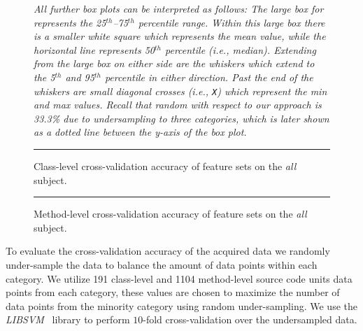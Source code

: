\begin{figure}[!tb]
  \centering
  \begin{adjustbox}{max size={.95\textwidth}{.95\textheight}}
    
  \end{adjustbox}
  \caption{Class-level cross-validation accuracy of feature sets on the \emph{all} subject.}
  \vspace{1mm}
  \footnotesize{\emph{All further box plots can be interpreted as follows: The large box for represents the 25$^{th}$--75$^{th}$ percentile range. Within this large box there is a smaller white square which represents the mean value, while the horizontal line represents 50$^{th}$ percentile (i.e., median). Extending from the large box on either side are the whiskers which extend to the 5$^{th}$ and 95$^{th}$ percentile in either direction. Past the end of the whiskers are small diagonal crosses (i.e., \texttt{X}) which represent the min and max values. Recall that random with respect to our approach is 33.3\% due to undersampling to three categories, which is later shown as a dotted line between the y-axis of the box plot.}}
  \vspace{2mm}
  \hrule
  \label{fig:all_cross_validation_features_class_graph}
\end{figure}

\begin{figure}[!tb]
  \centering
  \begin{adjustbox}{max size={.95\textwidth}{.95\textheight}}
    
  \end{adjustbox}
  \caption{Method-level cross-validation accuracy of feature sets on the \emph{all} subject.}
  \vspace{2mm}
  \hrule
  \label{fig:all_cross_validation_features_method_graph}
\end{figure}

To evaluate the cross-validation accuracy of the acquired data we randomly under-sample the data to balance the amount of data points within each category. We utilize 191 class-level and 1104 method-level source code units data points from each category, these values are chosen to maximize the number of data points from the minority category using random under-sampling. We use the \emph{LIBSVM}~\cite{CL11} library to perform $10$-fold cross-validation over the undersampled data.

